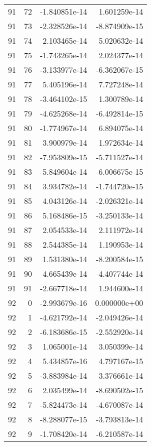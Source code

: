 \begin{tabular}{rrrr}
  91 &   72 & -1.840851e-14 &  1.601259e-14 \\
  91 &   73 & -2.328526e-14 & -8.874909e-15 \\
  91 &   74 &  2.103465e-14 &  5.020632e-14 \\
  91 &   75 & -1.743265e-14 &  2.024377e-14 \\
  91 &   76 & -3.133977e-14 & -6.362067e-15 \\
  91 &   77 &  5.405196e-14 &  7.727248e-14 \\
  91 &   78 & -3.464102e-15 &  1.300789e-14 \\
  91 &   79 & -4.625268e-14 & -6.492814e-15 \\
  91 &   80 & -1.774967e-14 &  6.894075e-14 \\
  91 &   81 &  3.900979e-14 &  1.972634e-14 \\
  91 &   82 & -7.953809e-15 & -5.711527e-14 \\
  91 &   83 & -5.849604e-14 & -6.006675e-15 \\
  91 &   84 &  3.934782e-14 & -1.744720e-15 \\
  91 &   85 &  4.043126e-14 & -2.026321e-14 \\
  91 &   86 &  5.168486e-15 & -3.250133e-14 \\
  91 &   87 &  2.054533e-14 &  2.111972e-14 \\
  91 &   88 &  2.544385e-14 &  1.190953e-14 \\
  91 &   89 &  1.531380e-14 & -8.200584e-15 \\
  91 &   90 &  4.665439e-14 & -4.407744e-14 \\
  91 &   91 & -2.667718e-14 &  1.944600e-14 \\
  92 &    0 & -2.993679e-16 &  0.000000e+00 \\
  92 &    1 & -4.621792e-14 & -2.049426e-14 \\
  92 &    2 & -6.183686e-15 & -2.552920e-14 \\
  92 &    3 &  1.065001e-14 &  3.050399e-14 \\
  92 &    4 &  5.434857e-16 &  4.797167e-15 \\
  92 &    5 & -3.883984e-14 &  3.376661e-14 \\
  92 &    6 &  2.035499e-14 & -8.690502e-15 \\
  92 &    7 & -5.824473e-14 & -4.670087e-14 \\
  92 &    8 & -8.288077e-15 & -3.793813e-14 \\
  92 &    9 & -1.708420e-14 & -6.210587e-14 \\

\end{tabular}

